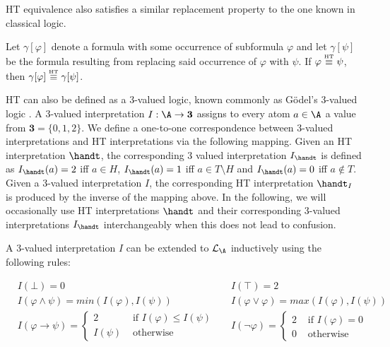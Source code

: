 HT equivalence also satisfies a similar replacement property
to the one known in classical logic.

\begin{proposition}
  Let $\gamma[\varphi]$ denote a formula with some occurrence of
  subformula $\varphi$ and let $\gamma[\psi]$ be the formula resulting
  from replacing said occurrence of $\varphi$ with $\psi$. If
  $\varphi \stackrel{\normalfont\mbox{\tiny HT}}{\equiv} \psi$, then $\gamma[\varphi] \stackrel{\normalfont\mbox{\tiny HT}}{\equiv} \gamma[\psi]$.
\end{proposition}

HT can also be defined as a 3-valued logic, known commonly as Gödel's
3-valued logic \cite{capeva05a}. A 3-valued interpretation
$I: \A \rightarrow \textbf{3}$ assigns to every atom $a\in \A$ a value
from $\textbf{3}=\{ 0, 1, 2 \}$. We define a one-to-one correspondence
between 3-valued interpretations and HT interpretations via the
following mapping. Given an HT interpretation $\handt$, the
corresponding 3 valued interpretation $I_{\handt}$ is defined as
$I_{\handt}(a)=2$ iff $a \in H$, $I_{\handt}(a)=1$ iff
$a \in T \setminus H$ and $I_{\handt}(a)=0$ iff $a \not\in T$. Given a
3-valued interpretation $I$, the corresponding HT interpretation
$\handt_{I}$ is produced by the inverse of the mapping above. In the
following, we will occasionally use HT interpretations $\handt$ and
their corresponding 3-valued interpretations $I_{\handt}$
interchangeably when this does not lead to confusion.

A 3-valued interpretation $I$ can be extended to $\mathcal{L}_\A$
inductively using the following rules:
\begin{definition}\label{def:3-valued-extension}
  \begin{align*}
    &I(\bot) = 0
    &&I(\top) = 2 \\
    &I(\varphi \wedge \psi) = min(I(\varphi),I(\psi)) 
    &&I(\varphi \vee \varphi) = max(I(\varphi),I(\psi)) \\
    &I(\varphi \rightarrow \psi) = 
      \begin{cases}
        2 & \text { if } I(\varphi) \leq I(\psi) \\
        I(\psi) & \text { otherwise }
      \end{cases}
    &&I(\neg \varphi) = \begin{cases}2 
      & \text { if } I(\varphi)=0 \\ 
      0 & \text { otherwise }\end{cases}
  \end{align*}
\end{definition}

